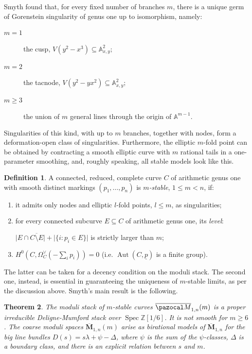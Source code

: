 \documentclass[11pt]{amsart}
\newcommand{\Aaff}{\mathbb A}
\newcommand{\oM}{\overline{\pazocal M}}
\newcommand{\Aut}{\operatorname{Aut}}
\theoremstyle{plain}
\newtheorem{thm}{Theorem}[section]
\theoremstyle{definition}
\newtheorem{dfn}[thm]{Definition}
\begin{document}
Smyth found that, for every fixed number of branches $m$, there is a unique germ of Gorenstein singularity of genus one up to isomorphism, namely:
\begin{description}
 \item[$m=1$] the cusp, $V(y^2-x^3)\subseteq\Aaff^2_{x,y}$;
 \item[$m=2$] the tacnode, $V(y^2-yx^2)\subseteq\Aaff^2_{x,y}$;
 \item[$m\geq 3$] the union of $m$ general lines through the origin of $\Aaff^{m-1}$.
\end{description}
Singularities of this kind, with up to $m$ branches, together with nodes, form a deformation-open class of singularities. Furthermore, the elliptic $m$-fold point can be obtained by contracting a smooth elliptic curve with $m$ rational tails in a one-parameter smoothing, and, roughly speaking, all stable models look like this.
\begin{dfn}\cite{SMY1}
 A connected, reduced, complete curve $C$ of arithmetic genus one with smooth distinct markings $(p_1,\ldots,p_n)$ is \emph{$m$-stable}, $1\leq m<n$, if:
 \begin{enumerate}[leftmargin=0.7cm]
  \item it admits only nodes and elliptic $l$-fold points, $l\leq m$, as singularities;
  \item for every connected subcurve $E\subseteq C$ of arithmetic genus one, its \emph{level}:
  
  \noindent$\lvert E\cap\overline{C\setminus E}\rvert+\lvert\{i\colon p_i\in E\}\rvert$ is strictly larger than $m$;
  \item $H^0(C,\Omega_C^\vee(-\sum_i p_i))=0$ (i.e. $\Aut(C,\underline p)$ is a finite group).
 \end{enumerate}
\end{dfn}
The latter can be taken for a decency condition on the moduli stack. The second one, instead, is essential in guaranteeing the uniqueness of $m$-stable limits, as per the discussion above. Smyth's main result is the following.
\begin{thm}\cite{SMY1,SMY2}
 The moduli stack of $m$-stable curves $\oM_{1,n}(m)$ is a proper irreducible Deligne-Mumford stack over $\operatorname{Spec}\mathbb Z[1/6]$. It is \emph{not} smooth for $m\geq 6$. The coarse moduli spaces $\overline{\mathbf{M}}_{1,n}(m)$ arise as birational models of $\overline{\mathbf{M}}_{1,n}$ for the big line bundles $D(s)=s\lambda+\psi-\Delta$, where $\psi$ is the sum of the $\psi$-classes, $\Delta$ is a boundary class, and there is an explicit relation between $s$ and $m$.
\end{thm}
\end{document}
